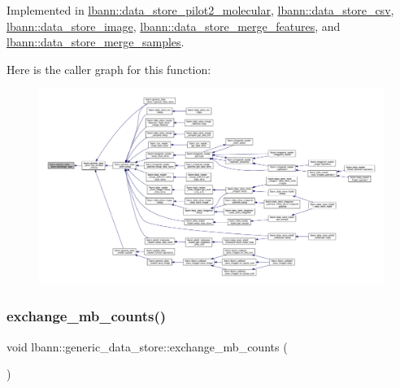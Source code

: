 Implemented in \hyperlink{classlbann_1_1data__store__pilot2__molecular_addaa6db4e1b3a25424da9da63c0b3616}{lbann\+::data\+\_\+store\+\_\+pilot2\+\_\+molecular}, \hyperlink{classlbann_1_1data__store__csv_acacd039d3ca8caf8958b731a1ce382c6}{lbann\+::data\+\_\+store\+\_\+csv}, \hyperlink{classlbann_1_1data__store__image_a5ff5eccbd469caca692e8259f6f8c021}{lbann\+::data\+\_\+store\+\_\+image}, \hyperlink{classlbann_1_1data__store__merge__features_a6a55e3959727a104b4470ba51e0988c3}{lbann\+::data\+\_\+store\+\_\+merge\+\_\+features}, and \hyperlink{classlbann_1_1data__store__merge__samples_a89dc9b0e04c8279cee5e89be2f2ed2a3}{lbann\+::data\+\_\+store\+\_\+merge\+\_\+samples}.

Here is the caller graph for this function\+:\nopagebreak
\begin{figure}[H]
\begin{center}
\leavevmode
\includegraphics[width=350pt]{classlbann_1_1generic__data__store_a5a34663fbbc3714d45743a6ca7195f51_icgraph}
\end{center}
\end{figure}
\mbox{\label{classlbann_1_1generic__data__store_abd5bf0321c063996369e1e2659bd99aa}} 
\subsubsection{\texorpdfstring{exchange\+\_\+mb\+\_\+counts()}{exchange\_mb\_counts()}}
{\footnotesize\ttfamily void lbann\+::generic\+\_\+data\+\_\+store\+::exchange\+\_\+mb\+\_\+counts (\begin{DoxyParamCaption}{ }\end{DoxyParamCaption})\hspace{0.3cm}{\ttfamily [protected]}}



